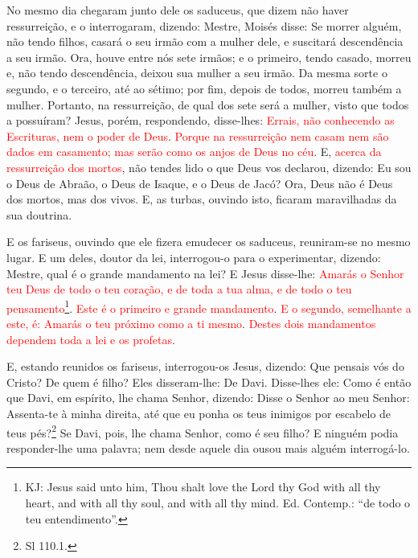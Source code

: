 No mesmo dia chegaram junto dele os saduceus, que dizem não haver
ressurreição, e o interrogaram, dizendo: Mestre, Moisés
disse: Se morrer alguém, não tendo filhos, casará o seu irmão com a
mulher dele, e suscitará descendência a seu irmão. Ora, houve
entre nós sete irmãos; e o primeiro, tendo casado, morreu e, não
tendo descendência, deixou sua mulher a seu irmão. Da mesma
sorte o segundo, e o terceiro, até ao sétimo; por fim, depois
de todos, morreu também a mulher. Portanto, na ressurreição,
de qual dos sete será a mulher, visto que todos a possuíram?
Jesus, porém, respondendo, disse-lhes: \textcolor{red}{Errais, não
conhecendo as Escrituras, nem o poder de Deus}.
\textcolor{red}{Porque na ressurreição nem casam nem são dados em
casamento; mas serão como os anjos de Deus no céu}. E,
\textcolor{red}{acerca da ressurreição dos mortos}, não tendes lido o que
Deus vos declarou, dizendo: Eu sou o Deus de Abraão, o Deus
de Isaque, e o Deus de Jacó? Ora, Deus não é Deus dos mortos, mas
dos vivos. E, as turbas, ouvindo isto, ficaram maravilhadas
da sua doutrina.

E os fariseus, ouvindo que ele fizera emudecer os saduceus,
reuniram-se no mesmo lugar. E um deles, doutor da lei,
interrogou-o para o experimentar, dizendo: Mestre, qual é o
grande mandamento na lei? E Jesus disse-lhe: \textcolor{red}{Amarás o
Senhor teu Deus de todo o teu coração, e de toda a tua alma, e de
todo o teu pensamento}\footnote{KJ: Jesus said unto him, Thou shalt
love the Lord thy God with all thy heart, and with all thy soul, and
with all thy mind. Ed. Contemp.: ``de todo o teu entendimento''.}.
\textcolor{red}{Este é o primeiro e grande mandamento}.
\textcolor{red}{E o segundo, semelhante a este, é: Amarás o teu
próximo como a ti mesmo}. \textcolor{red}{Destes dois mandamentos
dependem toda a lei e os profetas}.

E, estando reunidos os fariseus, interrogou-os Jesus,
dizendo: Que pensais vós do Cristo? De quem é filho? Eles
disseram-lhe: De Davi. Disse-lhes ele: Como é então que Davi,
em espírito, lhe chama Senhor, dizendo: Disse o Senhor ao meu
Senhor: Assenta-te à minha direita, até que eu ponha os teus
inimigos por escabelo de teus pés?\footnote{Sl 110.1.} Se
Davi, pois, lhe chama Senhor, como é seu filho? E ninguém
podia responder-lhe uma palavra; nem desde aquele dia ousou mais
alguém interrogá-lo.

\medskip

